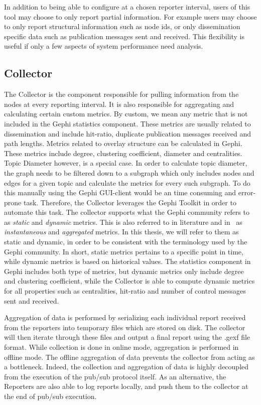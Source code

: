 In addition to being able to configure at a chosen reporter interval,
users of this tool may choose to only report partial information. For
example users may choose to only report structural information such as
node ids, or only dissemination specific data such as publication
messages sent and received. This flexibility is useful if only a few
aspects of system performance need analysis.

\subsection{Collector}

The Collector is the component responsible for pulling information from
the nodes at every reporting interval. It is also responsible for
aggregating and calculating certain custom metrics. By custom, we mean
any metric that is not included in the Gephi statistics component. These
metrics are usually related to dissemination and include hit-ratio,
duplicate publication messages received and path lengths. Metrics
related to overlay structure can be calculated in Gephi. These metrics
include degree, clustering coefficient, diameter and centralities. Topic
Diameter however, is a special case. In order to calculate topic
diameter, the graph needs to be filtered down to a subgraph which only
includes nodes and edges for a given topic and calculate the metrics for
every such subgraph. To do this manually using
the Gephi GUI-client would be an time consuming and error-prone task.
Therefore, the Collector  leverages the Gephi Toolkit in order to
automate this task. The collector supports what the Gephi community
refers to as \emph{static} and \emph{dynamic} metrics. This is also
referred to in literature and in~\cite{korsveien2014vizpub} as
\emph{instantaneous} and \emph{aggregated} metrics. In this thesis, we
will refer to them as static and dynamic, in order to be consistent
with the terminology used by the Gephi community. In short, static
metrics pertains to a specific point in time, while dynamic metrics is
based on historical values. The statistics component in Gephi includes
both type of metrics, but dynamic metrics only include degree and
clustering coefficient, while the Collector is able to compute dynamic
metrics for all properties such as centralities, hit-ratio and number of
control messages sent and received.

Aggregation of data is performed by serializing each individual report received
from the reporters into temporary files which are stored on disk. The
collector will then iterate through these files and output a final
report using the .gexf file format. While collection is done in online
mode, aggregation is performed in offline mode. The offline aggregation
of data prevents the collector from acting as a bottleneck. Indeed, the
collection and aggregation of data is highly decoupled from the
execution of the pub/sub protocol itself. As an alternative,
the Reporters are also able to log reports locally, and push them to
the collector at the end of pub/sub execution.

